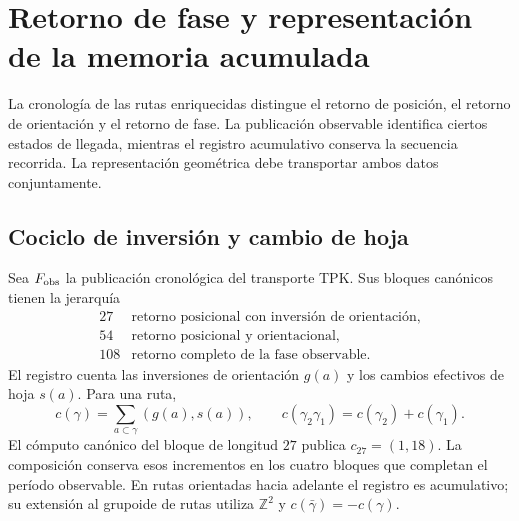 
\section{Retorno de fase y representación de la memoria acumulada}
\label{vii:sec:retorno-memoria-gravedad}

La cronología de las rutas enriquecidas distingue el retorno de posición,
el retorno de orientación y el retorno de fase. La publicación observable
identifica ciertos estados de llegada, mientras el registro acumulativo
conserva la secuencia recorrida. La representación geométrica debe
transportar ambos datos conjuntamente.

\subsection{Cociclo de inversión y cambio de hoja}
\label{vii:subsec:cociclo-memoria}

Sea \(F_{\rm obs}\) la publicación cronológica del transporte TPK.
Sus bloques canónicos tienen la jerarquía
\[
\begin{array}{c|l}
27&\text{retorno posicional con inversión de orientación},\\
54&\text{retorno posicional y orientacional},\\
108&\text{retorno completo de la fase observable}.
\end{array}
\]
El registro cuenta las inversiones de orientación \(g(a)\) y los
cambios efectivos de hoja \(s(a)\). Para una ruta,
\begin{equation}
 c(\gamma)=\sum_{a\subset\gamma}(g(a),s(a)),\qquad
 c(\gamma_2\gamma_1)=c(\gamma_2)+c(\gamma_1).
 \label{vii:eq:cociclo-ruta}
\end{equation}
El cómputo canónico del bloque de longitud \(27\) publica
\(c_{27}=(1,18)\). La composición conserva esos incrementos en
los cuatro bloques que completan el período observable.
En rutas orientadas hacia adelante el registro es acumulativo;
su extensión al grupoide de rutas utiliza \(\mathbb Z^2\) y
\(c(\bar\gamma)=-c(\gamma)\).

